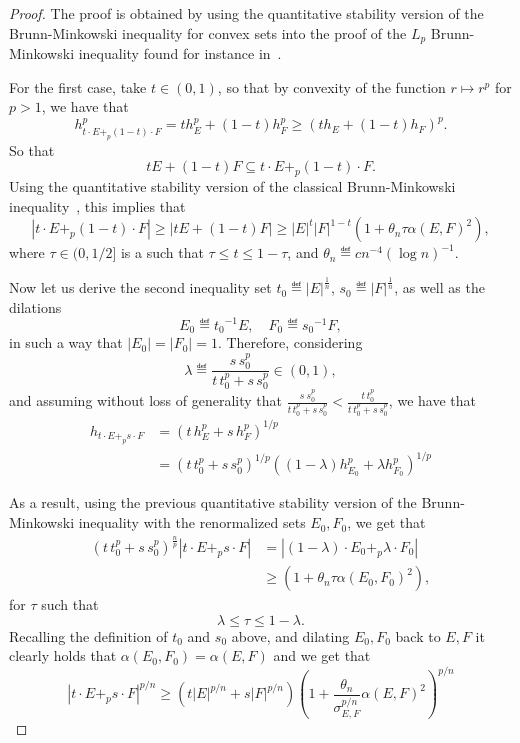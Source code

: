 \documentclass[a4paper, 10pt, twoside]{amsart}
\numberwithin{equation}{section}
\theoremstyle{plain}
\theoremstyle{definition}
\begin{document}
\begin{proof}
    The proof is obtained by using the quantitative stability version of the Brunn-Minkowski inequality for convex sets into the proof of the $L_p$ Brunn-Minkowski inequality found for instance in~\cite{boroczky2025isoperimetric}. 

    For the first case, take $t \in (0,1)$, so that by convexity of the function $r \mapsto r^p$ for $p > 1$, we have that 
    \[
        h^p_{t\cdot E +_p (1-t)\cdot F} 
        = 
        t h_E^p + (1-t) h_F^p
        \ge 
        (t h_E + (1-t) h_F)^p. 
    \]
    So that 
    \[
        t E + (1-t) F \subseteq t\cdot E +_p (1-t)\cdot F. 
    \]
    Using the quantitative stability version of the classical Brunn-Minkowski inequality~\cite[Corollary~8.6.5]{boroczky2025isoperimetric}, this implies that 
    \[
        |t\cdot E +_p (1-t)\cdot F|
        \ge 
        |t E + (1-t) F|
        \ge 
        |E|^t|F|^{1-t}
        \left(
            1 + \theta_n \tau \alpha(E,F)^2
        \right),
    \]
    where $\tau \in (0,1/2]$ is a such that $\tau \le t \le 1 - \tau$, and $\theta_n \eqdef cn^{-4}{(\log n)}^{-1}$.  

    Now let us derive the second inequality set $t_0 \eqdef |E|^{\frac{1}{n}}$, $s_0 \eqdef |F|^{\frac{1}{n}}$, as well as the dilations 
    \[
        E_0 \eqdef {t_0}^{-1}E, \quad 
        F_0 \eqdef {s_0}^{-1}F,
    \]
    in such a way that $|E_0| = |F_0| = 1$. Therefore, considering 
    \[
        \lambda \eqdef \frac{s\,s_0^p}{t\,t_0^p + s\,s_0^p} \in (0,1),
    \]
    and assuming without loss of generality that $\frac{s\ s_0^p}{t\,t_0^p + s\,s_0^p} < \frac{t\,t_0^p}{t\,t_0^p + s\,s_0^p}$, we have that 
    \begin{align*}
        h_{t\cdot E +_p s\cdot F}
        &= 
        {\left(
            t\,h_{E}^p + s\,h_{F}^p
        \right)}^{1/p}  \\ 
        &= 
        {\left(
          t\,t_0^p + s\,s_0^p
        \right)}^{1/p} 
        {\left(
            (1-\lambda) h_{E_0}^p +
            \lambda h_{F_0}^p
        \right)}^{1/p}
    \end{align*}

    As a result, using the previous quantitative stability version of the Brunn-Minkowski inequality with the renormalized sets $E_0, F_0$, we get that 
    \begin{align*}
        {(t\,t_0^p + s\,s_0^p)}^{\frac{n}{p}}
        |t\cdot E +_p s\cdot F|
        &= 
        |(1-\lambda)\cdot E_0 +_p \lambda\cdot F_0|\\ 
        &\ge \left(
            1 + \theta_n \tau {\alpha(E_0, F_0)}^2
        \right),
    \end{align*}
    for $\tau$ such that 
    \[
        \lambda \le \tau \le 1-\lambda. 
    \]
    Recalling the definition of $t_0$ and $s_0$ above, and dilating $E_0,F_0$ back to $E,F$ it clearly holds that $\alpha(E_0,F_0) = \alpha(E,F)$ and we get that 
    \[
        {|t\cdot E +_p s\cdot F|}^{p/n} 
        \ge 
        \left(
            t {|E|}^{p/n} + s {|F|}^{p/n}
        \right)
        {\left(
            1 + \frac{\theta_n}{
                \sigma_{E,F}^{p/n}
            } {\alpha(E, F)}^2
        \right)}^{p/n}
    \]


\end{proof}
\end{document}
